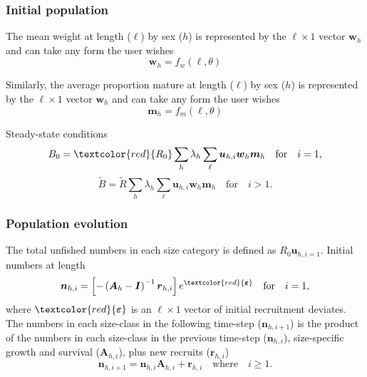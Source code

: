 \documentclass{beamer}
\begin{document}
\begin{frame}
\frametitle{Initial population}
The mean weight at length ($\ell$) by sex ($h$) is represented by the $\ell
\times 1$ vector $\boldsymbol{w}_{h}$ and can take any form the user wishes
\begin{equation*}
  \boldsymbol{w}_{h} = f_w(\ell,\theta)
\end{equation*}

Similarly, the average proportion mature at length ($\ell$) by sex ($h$) is
represented by the $\ell \times 1$ vector $\boldsymbol{w}_{h}$ and can take any
form the user wishes
\begin{equation*}
  \boldsymbol{m}_{h} = f_m(\ell,\theta)
\end{equation*}

Steady-state conditions
\begin{equation*}
  B_0 = \textcolor{red}{R_0} \sum_h \lambda_h \sum_\ell \boldsymbol{u}_{h,i}
  \boldsymbol{w}_{h} \boldsymbol{m}_{h} \quad \text{for} \quad i=1,
\end{equation*}
\begin{equation*}
  \tilde{B} = \tilde{R} \sum_h \lambda_h \sum_\ell \boldsymbol{u}_{h,i} \boldsymbol{w}_{h}
  \boldsymbol{m}_{h} \quad \text{for} \quad i>1.
\end{equation*}
\end{frame}


\begin{frame}
\frametitle{Population evolution}
The total unfished numbers in each size category is defined as $R_0
\boldsymbol{u}_{h,i=1}$. Initial numbers at length
\begin{equation*}
  \boldsymbol{n}_{h,i} = \left[-\left( \boldsymbol{A}_{h} - \boldsymbol{I}
    \right)^{-1} \boldsymbol{r}_{h,i} \right] e^{\textcolor{red}{\boldsymbol\varepsilon}} \quad
  \text{for} \quad i=1,
\end{equation*}
where $\textcolor{red}{\boldsymbol\varepsilon}$ is an $\ell \times 1$ vector of
initial recruitment deviates. The numbers in each size-class in the following
time-step ($\boldsymbol{n}_{h,i+1}$) is the product of the numbers in each
size-class in the previous time-step ($\boldsymbol{n}_{h,i}$), size-specific
growth and survival ($\boldsymbol{A}_{h,i}$), plus new recruits
($\boldsymbol{r}_{h,i}$)
\begin{equation*}
  \boldsymbol{n}_{h,i+1} = \boldsymbol{n}_{h,i} \boldsymbol{A}_{h,i} +
  \boldsymbol{r}_{h,i} \quad \text{where} \quad i \ge 1.
\end{equation*}
\end{frame}
\end{document}
